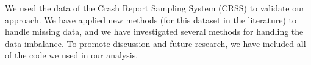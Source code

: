 We used the data of the Crash Report Sampling System (CRSS) to validate our approach.  We have applied new methods (for this dataset in the literature) to handle missing data, and we have investigated several methods for handling the data imbalance.  To promote discussion and future research, we have included all of the code we used in our analysis.  
